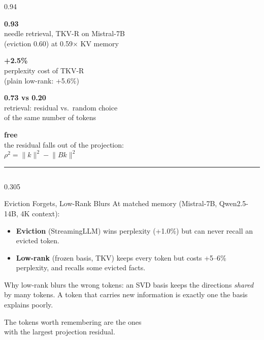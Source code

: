 \documentclass[final]{beamer}
\newcommand{\takeaway}[1]{%
  \begin{center}
  \colorbox{soft}{\parbox{0.96\linewidth}{\vspace{0.35cm}\centering\large #1\vspace{0.35cm}}}
  \end{center}}
\newcommand{\stat}[3]{%
  \begin{minipage}[t]{0.235\linewidth}\centering
    {\fontsize{76}{76}\selectfont\bfseries\color{#1}#2}\\[0.4cm]
    {\large #3}
  \end{minipage}}
\begin{document}
\begin{frame}[t]
\vspace{0.5cm}

\begin{columns}[t]
\begin{column}{0.94\paperwidth}
\stat{accent}{0.93}{needle retrieval, TKV-R on Mistral-7B\\ (eviction 0.60) at 0.59$\times$ KV memory}\hfill
\stat{accent}{+2.5\%}{perplexity cost of TKV-R\\ (plain low-rank: +5.6\%)}\hfill
\stat{teal}{0.73 vs 0.20}{retrieval: residual vs.\ random choice\\ of the same number of tokens}\hfill
\stat{good}{free}{the residual falls out of the projection:\\ $\rho^2 = \lVert k\rVert^2 - \lVert B k\rVert^2$}
\par\vspace{0.4cm}
{\color{muted!40}\rule{\linewidth}{2pt}}
\end{column}
\end{columns}

\vspace{0.4cm}

\begin{columns}[t]
\begin{column}{0.305\paperwidth}

\begin{block}{Eviction Forgets, Low-Rank Blurs}
At matched memory (Mistral-7B, Qwen2.5-14B, 4K context):
\vspace{0.2cm}
\begin{itemize}
  \item \textbf{Eviction} (StreamingLLM) wins perplexity (+1.0\%) but can never recall an evicted token.
  \item \textbf{Low-rank} (frozen basis, TKV) keeps every token but costs +5--6\% perplexity, and recalls some evicted facts.
\end{itemize}
\vspace{0.2cm}
Why low-rank blurs the wrong tokens: an SVD basis keeps the directions
\emph{shared} by many tokens. A token that carries new information is exactly
one the basis explains poorly.
\takeaway{The tokens worth remembering are the ones\\ with the largest projection residual.}
\end{block}


\end{column}
\end{columns}
\end{frame}
\end{document}
